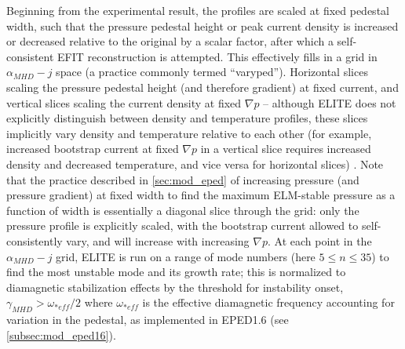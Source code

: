 Beginning from the experimental result, the profiles are scaled at fixed pedestal width, such that the pressure pedestal height or peak current density is increased or decreased relative to the original by a scalar factor, after which a self-consistent EFIT reconstruction is attempted.  This effectively fills in a grid in $\alpha_{MHD} - j$ space (a practice commonly termed ``varyped'').  Horizontal slices scaling the pressure pedestal height (and therefore gradient) at fixed current, and vertical slices scaling the current density at fixed $\nabla p$ -- although ELITE does not explicitly distinguish between density and temperature profiles, these slices implicitly vary density and temperature relative to each other (for example, increased bootstrap current at fixed $\nabla p$ in a vertical slice requires increased density and decreased temperature, and vice versa for horizontal slices) \cite{Snyder2013}.  Note that the practice described in \cref{sec:mod_eped} of increasing pressure (and pressure gradient) at fixed width to find the maximum ELM-stable pressure as a function of width is essentially a diagonal slice through the grid: only the pressure profile is explicitly scaled, with the bootstrap current allowed to self-consistently vary, and will increase with increasing $\nabla p$.  At each point in the $\alpha_{MHD} - j$ grid, ELITE is run on a range of mode numbers (here $5 \le n \le 35$) to find the most unstable mode and its growth rate; this is normalized to diamagnetic stabilization effects by the threshold for instability onset, $\gamma_{MHD} > \omega_{*eff}/2$ where $\omega_{*eff}$ is the effective diamagnetic frequency accounting for variation in the pedestal, as implemented in EPED1.6 (see \cref{subsec:mod_eped16}).

